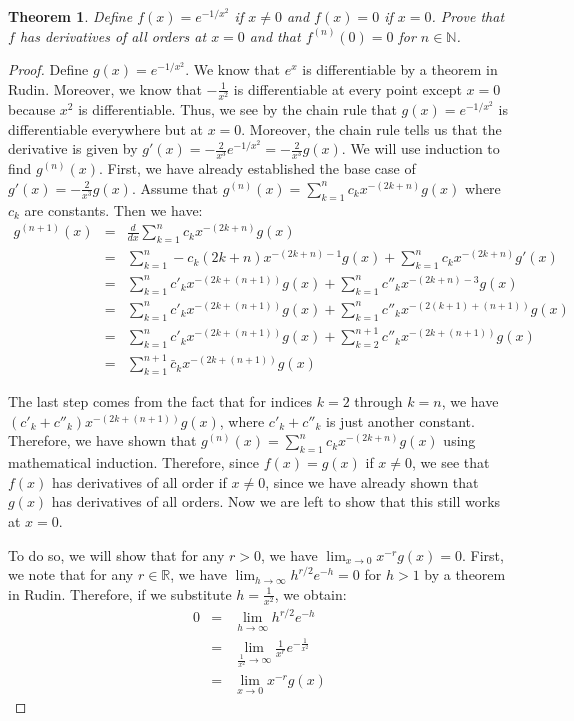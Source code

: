 \documentclass[psamsfonts]{amsart}
\newtheorem{thm}{Theorem}[section]
\theoremstyle{definition}
\theoremstyle{remark}
\numberwithin{equation}{section}
\begin{document}
\begin{thm}
Define $f(x) = e^{-1/x^2}$ if $x \neq 0$ and $f(x) = 0$ if $x = 0$. Prove that $f$ has derivatives of all orders at $x = 0$ and that $f^{(n)}(0) = 0$ for $n \in \mathbb{N}$.
\end{thm}

\begin{proof}
Define $g(x) = e^{-1/x^2}$. We know that $e^{x}$ is differentiable by a theorem in Rudin. Moreover, we know that $- \frac{1}{x^2}$ is differentiable at every point except $x = 0$ because $x^2$ is differentiable. Thus, we see by the chain rule that $g(x) = e^{-1/x^2}$ is differentiable everywhere but at $x=0$. Moreover, the chain rule tells us that the derivative is given by $g'(x) = - \frac{2}{x^3} e^{-1/x^2} = -\frac{2}{x^3} g(x)$. We will use induction to find $g^(n)(x)$. First, we have already established the base case of $g'(x) = - \frac{2}{x^3} g(x)$. Assume that $g^{(n)}(x) = \sum_{k=1}^n c_k x^{-(2k + n)} g(x)$ where $c_k$ are constants. Then we have:
\begin{eqnarray}
g^{(n+1)}(x) &=& \frac{d}{dx} \sum_{k=1}^n c_k x^{-(2k + n)} g(x) \\
&=& \sum_{k=1}^n -c_k (2k + n) x^{-(2k + n)-1} g(x) + \sum_{k=1}^n c_k x^{-(2k+n)} g'(x) \\
&=& \sum_{k=1}^n c'_k x^{-(2k + (n+1))} g(x) + \sum_{k=1}^n c''_k x^{-(2k + n)- 3} g(x) \\
&=& \sum_{k=1}^{n} c'_k x^{-(2k + (n+1))} g(x) + \sum_{k=1}^n c''_k x^{-(2(k+1)+(n+1))} g(x) \\
&=& \sum_{k=1}^n c'_k x^{-(2k + (n+1))} g(x) + \sum_{k=2}^{n+1} c''_k x^{-(2k + (n+1))} g(x) \\
&=& \sum_{k=1}^{n+1} \bar{c}_k x^{-(2k+(n+1))} g(x)
\end{eqnarray}

The last step comes from the fact that for indices $k=2$ through $k=n$, we have $(c'_k + c''_k) x^{-(2k+(n+1))}g(x)$, where $c'_k + c''_k$ is just another constant. Therefore, we have shown that $g^{(n)}(x) = \sum_{k=1}^n c_k x^{-(2k + n)} g(x)$ using mathematical induction. Therefore, since $f(x) = g(x)$ if $x \neq 0$, we see that $f(x)$ has derivatives of all order if $x \neq 0$, since we have already shown that $g(x)$ has derivatives of all orders. Now we are left to show that this still works at $x = 0$. 

To do so, we will show that for any $r > 0$, we have $\lim_{x \to 0} x^{-r} g(x) = 0$. First, we note that for any $r \in \mathbb{R}$, we have $\lim_{h \to \infty} h^{r/2} e^{-h} = 0$ for $h > 1$ by a theorem in Rudin. Therefore, if we substitute $h = \frac{1}{x^2}$, we obtain:
\begin{eqnarray}
0 &=& \lim_{h \to \infty} h^{r/2} e^{-h} \\
&=&  \lim_{\frac{1}{x^2} \to \infty} \frac{1}{x^r} e^{-\frac{1}{x^2}} \\
&=& \lim_{x \to 0} x^{-r} g(x)
\end{eqnarray}


\end{proof}
\end{document}
